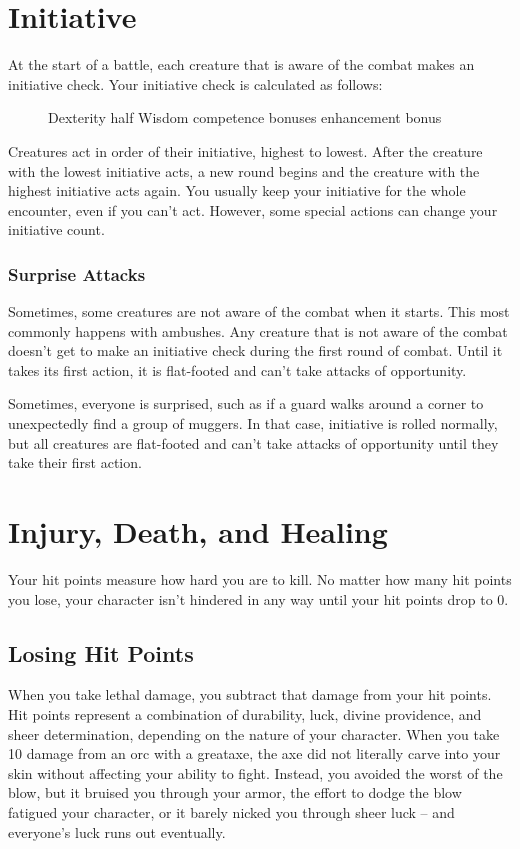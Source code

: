 \section{Initiative}\label{Initiative}

At the start of a battle, each creature that is aware of the combat makes an initiative check. Your initiative check is calculated as follows:

\begin{figure}[h]
    \centering Dexterity \add half Wisdom \add competence bonuses \add enhancement bonus
\end{figure}

Creatures act in order of their initiative, highest to lowest. After the creature with the lowest initiative acts, a new round begins and the creature with the highest initiative acts again. You usually keep your initiative for the whole encounter, even if you can't act. However, some special actions can change your initiative count.

\subsubsection{Surprise Attacks}\label{Surprise Attacks}
Sometimes, some creatures are not aware of the combat when it starts. This most commonly happens with ambushes. Any creature that is not aware of the combat doesn't get to make an initiative check during the first round of combat. Until it takes its first action, it is flat-footed and can't take attacks of opportunity.

Sometimes, everyone is surprised, such as if a guard walks around a corner to unexpectedly find a group of muggers. In that case, initiative is rolled normally, but all creatures are flat-footed and can't take attacks of opportunity until they take their first action.

\section{Injury, Death, and Healing}\label{Injury, Death, and Healing}
Your hit points measure how hard you are to kill. No matter how many hit points you lose, your character isn't hindered in any way until your hit points drop to 0.

\subsection{Losing Hit Points}
When you take lethal damage, you subtract that damage from your hit points.
 Hit points represent a combination of durability, luck, divine providence, and sheer determination, depending on the nature of your character. When you take 10 damage from an orc with a greataxe, the axe did not literally carve into your skin without affecting your ability to fight. Instead, you avoided the worst of the blow, but it bruised you through your armor, the effort to dodge the blow fatigued your character, or it barely nicked you through sheer luck -- and everyone's luck runs out eventually.

